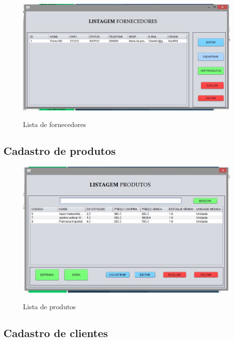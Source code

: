     \begin{figure}[H]
\centering
\caption{Lista de fornecedores}
\includegraphics[width=15cm]{imagens/telas/ListaFornecedor}
\label{fig:Lista de fornecedores}
\end{figure}
       
    \subsection{Cadastro de produtos}
       \begin{figure}[htp]
\centering
\caption{Lista de produtos}
\includegraphics[width=15cm]{imagens/telas/ListaProdutos}
\label{fig:Lista de produtos}
\end{figure}
        
        
    \subsection{Cadastro de clientes}
        

